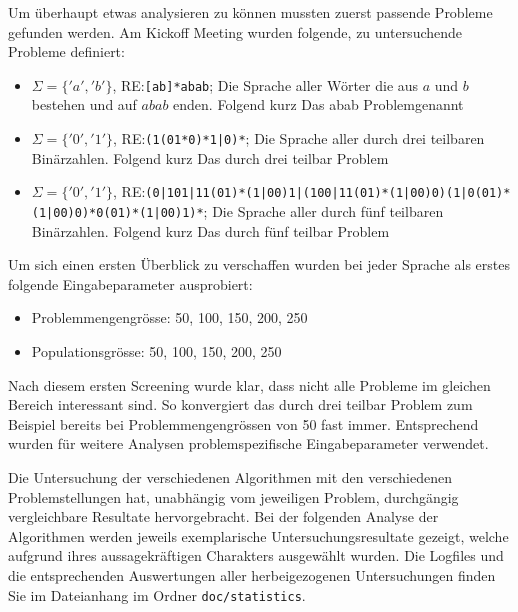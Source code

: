 Um überhaupt etwas analysieren zu können mussten zuerst passende Probleme gefunden werden. Am Kickoff Meeting wurden folgende, zu untersuchende Probleme definiert:
\begin{itemize}
\item $\Sigma=\{'a','b'\}$, RE:\lstinline$[ab]*abab$; Die Sprache aller Wörter die aus $a$ und $b$ bestehen und auf $abab$ enden. Folgend kurz \flqq Das abab Problem\frqq genannt
\item $\Sigma=\{'0','1'\}$, RE:\lstinline$(1(01*0)*1|0)*$; Die Sprache aller durch drei teilbaren Binärzahlen. Folgend kurz \flqq Das durch drei teilbar Problem\frqq
\item $\Sigma=\{'0','1'\}$, RE:\lstinline$(0|101|11(01)*(1|00)1|(100|11(01)*(1|00)0)(1|0(01)*(1|00)0)*0(01)*(1|00)1)*$; Die Sprache aller durch fünf teilbaren Binärzahlen. Folgend kurz \flqq Das durch fünf teilbar Problem \frqq
\end{itemize}

Um sich einen ersten Überblick zu verschaffen wurden bei jeder Sprache als erstes folgende Eingabeparameter ausprobiert:
\begin{itemize}
	\item Problemmengengrösse: 50, 100, 150, 200, 250
	\item Populationsgrösse: 50, 100, 150, 200, 250
\end{itemize}

Nach diesem ersten Screening wurde klar, dass nicht alle Probleme im gleichen Bereich interessant sind. So konvergiert das durch drei teilbar Problem zum Beispiel bereits bei Problemmengengrössen von 50 fast immer. Entsprechend wurden für weitere Analysen problemspezifische Eingabeparameter verwendet.

Die Untersuchung der verschiedenen Algorithmen mit den verschiedenen Problemstellungen hat, unabhängig vom jeweiligen Problem, durchgängig vergleichbare Resultate hervorgebracht. Bei der folgenden Analyse der Algorithmen werden jeweils exemplarische Untersuchungsresultate gezeigt, welche aufgrund ihres aussagekräftigen Charakters ausgewählt wurden. Die Logfiles und die entsprechenden Auswertungen aller herbeigezogenen Untersuchungen finden Sie im Dateianhang im Ordner \lstinline$doc/statistics$.